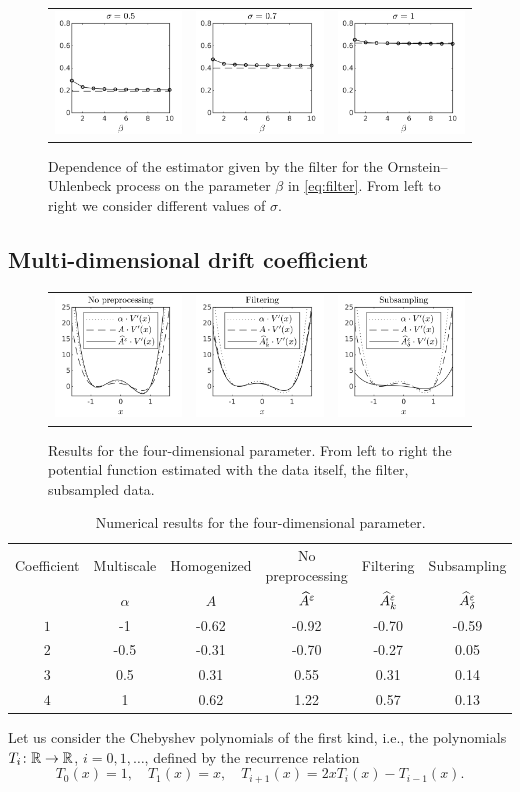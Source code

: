 \documentclass[10pt]{article}
\begin{document}
\begin{figure}[t]
	\centering
	\begin{tabular}{ccc}
		\includegraphics[]{Figures/OUBeta_s5} & \includegraphics[]{Figures/OUBeta_s7}  & \includegraphics[]{Figures/OUBeta_s10} \\
	\end{tabular}
	\caption{Dependence of the estimator given by the filter for the Ornstein--Uhlenbeck process on the parameter $\beta$ in \eqref{eq:filter}. From left to right we consider different values of $\sigma$.}
	\label{fig:OUBeta}
\end{figure}


\subsection{Multi-dimensional drift coefficient}

\begin{figure}[t]
	\centering
	\begin{tabular}{ccc}
		\includegraphics[]{Figures/KLNothing} & \includegraphics[]{Figures/KLFilt}  & \includegraphics[]{Figures/KLSubs}
	\end{tabular}
	\caption{Results for the four-dimensional parameter. From left to right the potential function estimated with the data itself, the filter, subsampled data.}
	\label{fig:KLStyle}
\end{figure}

\begin{table}[t]
	\centering
	\begin{tabular}{cccccc}
		\toprule
		Coefficient & Multiscale & Homogenized & No preprocessing  & Filtering  		  & Subsampling  			 \\ 
		& $\alpha$ & $A$   & $\widehat A^\varepsilon$ & $\widehat A^\varepsilon_k$ & $\widehat A^\varepsilon_\delta$ \\
		\midrule
		$1$ &-1   & -0.62 & -0.92 & -0.70 & -0.59\\
		$2$ &-0.5 & -0.31 & -0.70 & -0.27 & 0.05 \\
		$3$ & 0.5 & 0.31  & 0.55  & 0.31  & 0.14 \\
		$4$ & 1   & 0.62  & 1.22  & 0.57  & 0.13 \\
		\bottomrule
	\end{tabular}
	\caption{Numerical results for the four-dimensional parameter.}
	\label{tab:KLStyle}
\end{table}

Let us consider the Chebyshev polynomials of the first kind, i.e., the polynomials $T_i\colon \mathbb{R} \to \mathbb{R}$, $i=0, 1, \ldots$, defined by the recurrence relation
\begin{equation}
T_0(x) = 1, \quad T_1(x) = x, \quad T_{i+1}(x) = 2xT_i(x) - T_{i-1}(x).
\end{equation}
\end{document}
